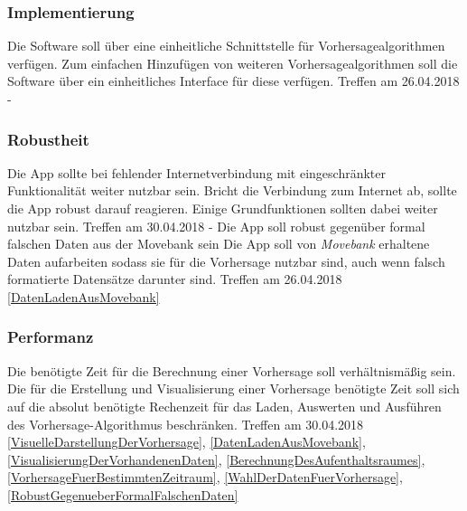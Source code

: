 \documentclass[12pt]{article} %
\begin{document}
\subsubsection{Implementierung}

\begin{requirements}[ref={(R\arabic*)},label=(R\arabic*),resume]
{
 Die Software soll über eine einheitliche Schnittstelle für Vorhersagealgorithmen verfügen.
 }{
 Zum einfachen Hinzufügen von weiteren Vorhersagealgorithmen soll die Software über ein einheitliches Interface für diese verfügen.
 }{
 Treffen am 26.04.2018
 }{
 -
}
\end{requirements}

\subsubsection{Robustheit}

\begin{requirements}[ref={(R\arabic*)},label=(R\arabic*),resume]
{
 Die App sollte bei fehlender Internetverbindung mit eingeschränkter Funktionalität weiter nutzbar sein. 
 }{
 Bricht die Verbindung zum Internet ab, sollte die App robust darauf reagieren. Einige Grundfunktionen sollten dabei weiter nutzbar sein. 
 }{
 Treffen am 30.04.2018 
 }{
 - 
}
{
 Die App soll robust gegenüber formal falschen Daten aus der Movebank sein 
 }{
 Die App soll von \textit{Movebank} erhaltene Daten aufarbeiten sodass sie für die Vorhersage nutzbar sind, auch wenn falsch formatierte Datensätze darunter sind.
 }{
 Treffen am 26.04.2018 
 }{
 \ref{DatenLadenAusMovebank} 
}
\end{requirements}

\subsubsection{Performanz}

\begin{requirements}[ref={(R\arabic*)},label=(R\arabic*),resume]

{
Die benötigte Zeit für die Berechnung einer Vorhersage soll verhältnismäßig sein.
 }{
 Die für die Erstellung und Visualisierung einer Vorhersage benötigte Zeit soll sich auf die absolut benötigte Rechenzeit für das Laden, Auswerten und Ausführen des Vorhersage-Algorithmus beschränken.
 }{
 Treffen am 30.04.2018 
 }{
 \ref{VisuelleDarstellungDerVorhersage}, \ref{DatenLadenAusMovebank}, \ref{VisualisierungDerVorhandenenDaten}, \ref{BerechnungDesAufenthaltsraumes}, \ref{VorhersageFuerBestimmtenZeitraum}, \ref{WahlDerDatenFuerVorhersage}, \ref{RobustGegenueberFormalFalschenDaten} 
}

\end{requirements}
\end{document}
